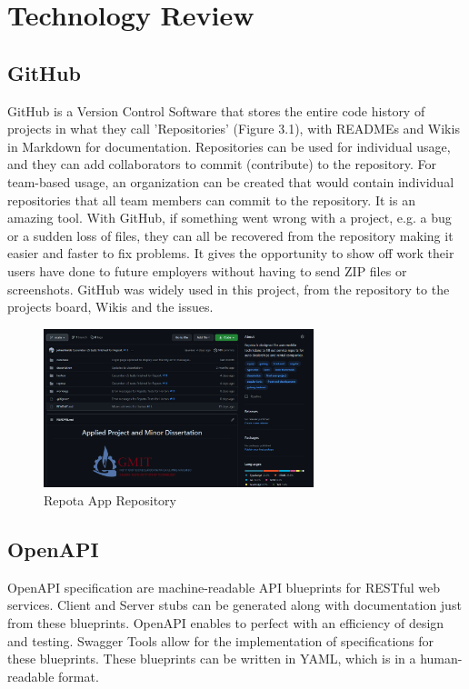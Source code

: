 \chapter{Technology Review}

\section{GitHub}
GitHub is a Version Control Software that stores the entire code history of projects in what they call 'Repositories' (Figure 3.1), with READMEs and Wikis in Markdown for documentation. Repositories can be used for individual usage, and they can add collaborators to commit (contribute) to the repository. For team-based usage, an organization can be created that would contain individual repositories that all team members can commit to the repository. It is an amazing tool. With GitHub, if something went wrong with a project, e.g. a bug or a sudden loss of files, they can all be recovered from the repository making it easier and faster to fix problems. It gives the opportunity to show off work their users have done to future employers without having to send ZIP files or screenshots. GitHub was widely used in this project, from the repository to the projects board, Wikis and the issues.

\begin{figure}[H]
    \caption{Repota App Repository}
    \label{image:gitRepo}
    \centering
    \includegraphics[width=0.7\textwidth]{images/misc/git-repo.png}
\end{figure}

\section{OpenAPI}
OpenAPI specification are machine-readable API blueprints for RESTful web services. Client and Server stubs can be generated along with documentation just from these blueprints. OpenAPI enables to perfect with an efficiency of design and testing. Swagger Tools allow for the implementation of specifications for these blueprints. These blueprints can be written in YAML, which is in a human-readable format. 

